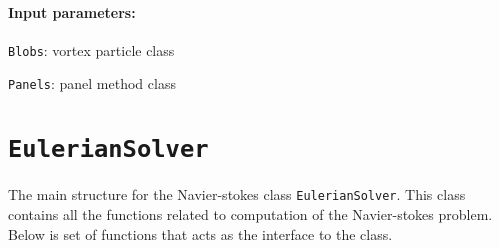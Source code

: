 	\paragraph{Input parameters:}
	\begin{list}{\quad}{}
	\item \texttt{Blobs}: vortex particle class
	\item \texttt{Panels}: panel method class				
	\end{list}


\newpage

\section*{\texttt{EulerianSolver}}
The main structure for the Navier-stokes class \texttt{EulerianSolver}. This class contains all the functions related to computation of the Navier-stokes problem. Below is set of functions that acts as the interface to the class.

\begin{figure}[h]
\centering
{}
\end{figure}



